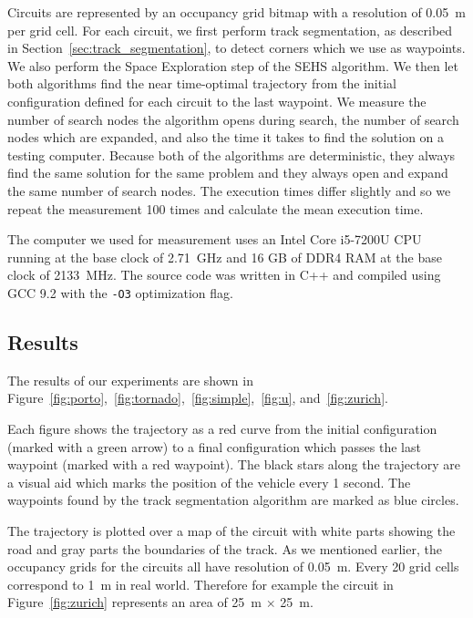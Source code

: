 Circuits are represented by an occupancy grid bitmap with a resolution of \SI{0.05}{\meter} per grid cell. For each circuit, we first perform track segmentation, as described in Section~\ref{sec:track_segmentation}, to detect corners which we use as waypoints. We also perform the Space Exploration step of the SEHS algorithm. We then let both algorithms find the near time-optimal trajectory from the initial configuration defined for each circuit to the last waypoint. We measure the number of search nodes the algorithm opens during search, the number of search nodes which are expanded, and also the time it takes to find the solution on a testing computer. Because both of the algorithms are deterministic, they always find the same solution for the same problem and they always open and expand the same number of search nodes. The execution times differ slightly and so we repeat the measurement 100 times and calculate the mean execution time.

The computer we used for measurement uses an Intel Core i5-7200U CPU running at the base clock of \SI{2.71}{\giga\hertz} and 16 GB of DDR4 RAM at the base clock of \SI{2133}{\mega\hertz}. The source code was written in C++ and compiled using GCC 9.2 with the \texttt{-O3} optimization flag.

\subsection{Results}

The results of our experiments are shown in Figure~\ref{fig:porto},~\ref{fig:tornado},~\ref{fig:simple},~\ref{fig:u}, and~\ref{fig:zurich}.

Each figure shows the trajectory as a red curve from the initial configuration (marked with a green arrow) to a final configuration which passes the last waypoint (marked with a red waypoint). The black stars along the trajectory are a visual aid which marks the position of the vehicle every 1 second. The waypoints found by the track segmentation algorithm are marked as blue circles.

The trajectory is plotted over a map of the circuit with white parts showing the road and gray parts the boundaries of the track. As we mentioned earlier, the occupancy grids for the circuits all have resolution of \SI{0.05}{\meter}. Every \num{20} grid cells correspond to \SI{1}{\meter} in real world. Therefore for example the circuit in Figure~\ref{fig:zurich} represents an area of \SI{25}{\meter} $\times$ \SI{25}{\meter}.

